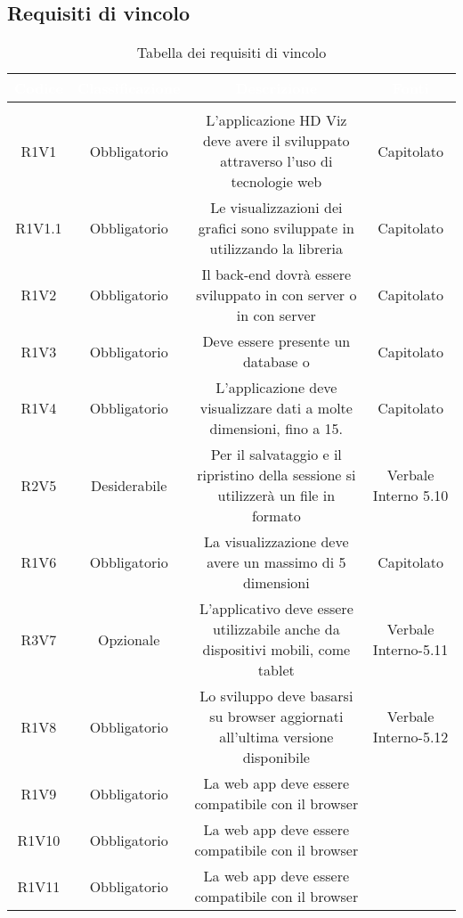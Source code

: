 \subsection{Requisiti di vincolo}
\renewcommand{\arraystretch}{1.5}
\begin{center}
\begin{longtable}{C{\colA} C{\colB} C{\colC} C{\colA}}
		\textcolor{white}{\textbf{Codice}} & 
		\textcolor{white}{\textbf{Classificazione}} & 
		\textcolor{white}{\textbf{Descrizione}} & 
		\textcolor{white}{\textbf{Fonti}} \\
		\endfirsthead
	    \\
	    \endfoot
	    \caption{Tabella dei requisiti di vincolo}
	    \endlastfoot

R1V1 & Obbligatorio & L'applicazione HD Viz deve avere il  sviluppato attraverso l'uso di tecnologie web & Capitolato \\
R1V1.1 & Obbligatorio & Le visualizzazioni dei grafici sono sviluppate in  utilizzando la libreria  & Capitolato\\
R1V2 & Obbligatorio & Il back-end dovrà essere sviluppato in  con server  o in  con server  & Capitolato \\
R1V3 & Obbligatorio & Deve essere presente un database  o  & Capitolato\\
R1V4 & Obbligatorio & L'applicazione deve visualizzare dati a molte dimensioni, fino a 15. & Capitolato\\
R2V5 & Desiderabile & Per il salvataggio e il ripristino della sessione si utilizzerà un file in formato  & Verbale Interno 5.10\\
R1V6 & Obbligatorio & La visualizzazione  deve avere un massimo di 5 dimensioni & Capitolato\\
R3V7 & Opzionale & L'applicativo deve essere utilizzabile anche da dispositivi mobili, come tablet & Verbale Interno-5.11\\
R1V8 & Obbligatorio & Lo sviluppo deve basarsi su browser aggiornati all'ultima versione disponibile & Verbale Interno-5.12\\
R1V9 & Obbligatorio & La web app deve essere compatibile con il browser  & \\
R1V10 & Obbligatorio & La web app deve essere compatibile con il browser  & \\
R1V11 & Obbligatorio & La web app deve essere compatibile con il browser  & \\



\end{longtable}
\end{center}